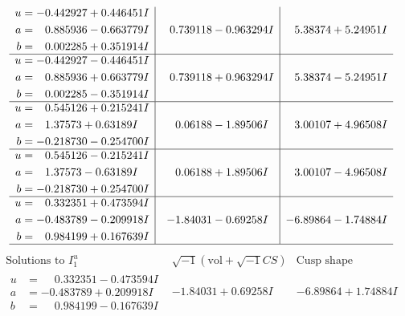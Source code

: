 \documentclass[1p]{elsarticle_modified}
\theoremstyle{definition}
\newcommand{\I}{\sqrt{-1}}
\begin{document}
$$\begin{array}{c|c|c}
\begin{aligned}
u &= -0.442927 + 0.446451 I \\
a &= \phantom{-}0.885936 - 0.663779 I \\
b &= \phantom{-}0.002285 + 0.351914 I\end{aligned}
 & \phantom{-}0.739118 - 0.963294 I & \phantom{-}5.38374 + 5.24951 I \\ \hline\begin{aligned}
u &= -0.442927 - 0.446451 I \\
a &= \phantom{-}0.885936 + 0.663779 I \\
b &= \phantom{-}0.002285 - 0.351914 I\end{aligned}
 & \phantom{-}0.739118 + 0.963294 I & \phantom{-}5.38374 - 5.24951 I \\ \hline\begin{aligned}
u &= \phantom{-}0.545126 + 0.215241 I \\
a &= \phantom{-}1.37573 + 0.63189 I \\
b &= -0.218730 - 0.254700 I\end{aligned}
 & \phantom{-}0.06188 - 1.89506 I & \phantom{-}3.00107 + 4.96508 I \\ \hline\begin{aligned}
u &= \phantom{-}0.545126 - 0.215241 I \\
a &= \phantom{-}1.37573 - 0.63189 I \\
b &= -0.218730 + 0.254700 I\end{aligned}
 & \phantom{-}0.06188 + 1.89506 I & \phantom{-}3.00107 - 4.96508 I \\ \hline\begin{aligned}
u &= \phantom{-}0.332351 + 0.473594 I \\
a &= -0.483789 - 0.209918 I \\
b &= \phantom{-}0.984199 + 0.167639 I\end{aligned}
 & -1.84031 - 0.69258 I & -6.89864 - 1.74884 I\\
 \hline 
 \end{array}$$\newpage$$\begin{array}{c|c|c}  
\text{Solutions to }I^u_{1}& \I (\text{vol} + \sqrt{-1}CS) & \text{Cusp shape}\\
 \hline 
\begin{aligned}
u &= \phantom{-}0.332351 - 0.473594 I \\
a &= -0.483789 + 0.209918 I \\
b &= \phantom{-}0.984199 - 0.167639 I\end{aligned}
 & -1.84031 + 0.69258 I & -6.89864 + 1.74884 I \\ \hline\begin{aligned}

\end{aligned}
\end{array}$$
\end{document}
